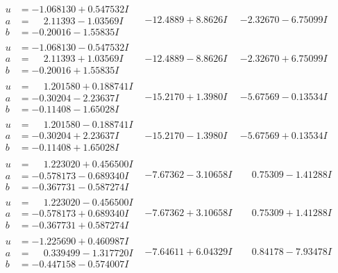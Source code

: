 \documentclass[1p]{elsarticle_modified}
\theoremstyle{definition}
\begin{document}
$$\begin{array}{c|c|c}
\begin{aligned}
u &= -1.068130 + 0.547532 I \\
a &= \phantom{-}2.11393 - 1.03569 I \\
b &= -0.20016 - 1.55835 I\end{aligned}
 & -12.4889 + 8.8626 I & -2.32670 - 6.75099 I \\ \hline\begin{aligned}
u &= -1.068130 - 0.547532 I \\
a &= \phantom{-}2.11393 + 1.03569 I \\
b &= -0.20016 + 1.55835 I\end{aligned}
 & -12.4889 - 8.8626 I & -2.32670 + 6.75099 I \\ \hline\begin{aligned}
u &= \phantom{-}1.201580 + 0.188741 I \\
a &= -0.30204 - 2.23637 I \\
b &= -0.11408 - 1.65028 I\end{aligned}
 & -15.2170 + 1.3980 I & -5.67569 - 0.13534 I \\ \hline\begin{aligned}
u &= \phantom{-}1.201580 - 0.188741 I \\
a &= -0.30204 + 2.23637 I \\
b &= -0.11408 + 1.65028 I\end{aligned}
 & -15.2170 - 1.3980 I & -5.67569 + 0.13534 I \\ \hline\begin{aligned}
u &= \phantom{-}1.223020 + 0.456500 I \\
a &= -0.578173 - 0.689340 I \\
b &= -0.367731 - 0.587274 I\end{aligned}
 & -7.67362 - 3.10658 I & \phantom{-}0.75309 - 1.41288 I \\ \hline\begin{aligned}
u &= \phantom{-}1.223020 - 0.456500 I \\
a &= -0.578173 + 0.689340 I \\
b &= -0.367731 + 0.587274 I\end{aligned}
 & -7.67362 + 3.10658 I & \phantom{-}0.75309 + 1.41288 I \\ \hline\begin{aligned}
u &= -1.225690 + 0.460987 I \\
a &= \phantom{-}0.339499 - 1.317720 I \\
b &= -0.447158 - 0.574007 I\end{aligned}
 & -7.64611 + 6.04329 I & \phantom{-}0.84178 - 7.93478 I \\ \hline\begin{aligned}

\end{aligned}
\end{array}$$
\end{document}

